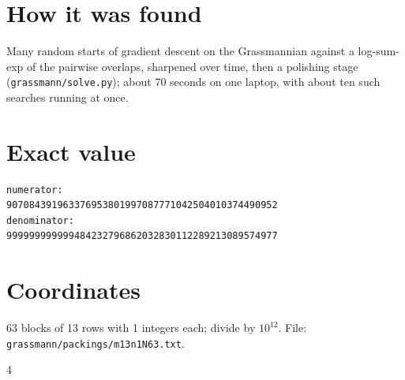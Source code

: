 \documentclass[11pt,a4paper]{article}
\begin{document}
\section{How it was found}
Many random starts of gradient descent on the Grassmannian against a log-sum-exp of the pairwise overlaps, sharpened over time, then a polishing stage (\texttt{grassmann/solve.py}); about 70 seconds on one laptop, with about ten such searches running at once.


\appendix
\section{Exact value}
{\small
\begin{verbatim}
numerator:
907084391963376953801997087771042504010374490952
denominator:
999999999999484232796862032830112289213089574977
\end{verbatim}}

\section{Coordinates}
63 blocks of 13 rows with 1 integers each; divide by $10^{12}$. File: \texttt{grassmann/packings/m13n1N63.txt}.
{\tiny
\begin{multicols}{4}
\end{multicols}}
\end{document}
